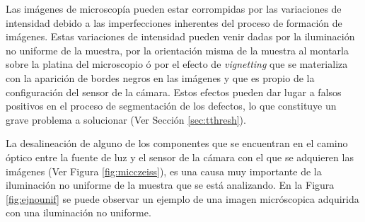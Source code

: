 Las imágenes de microscopía pueden estar corrompidas por las variaciones de intensidad debido a las imperfecciones inherentes del proceso de formación de imágenes. Estas variaciones de intensidad pueden venir dadas por la iluminación no uniforme de la muestra, por la orientación misma de la muestra al montarla sobre la platina del microscopio ó por el efecto de \textit{vignetting} que se materializa con la aparición de bordes negros en las imágenes y que es propio de la configuración del sensor de la cámara. Estos efectos pueden dar lugar a falsos positivos en el proceso de segmentación de los defectos, lo que constituye un grave problema a solucionar (Ver Sección \ref{sec:tthresh}).

La desalineación de alguno de los componentes que se encuentran en el camino óptico entre la fuente de luz y el sensor de la cámara con el que se adquieren las imágenes (Ver Figura \ref{fig:micczeiss}), es una causa muy importante de la iluminación no uniforme de la muestra que se está analizando. En la Figura \ref{fig:ejnounif} se puede observar un ejemplo de una imagen micróscopica adquirida con una iluminación no uniforme.
